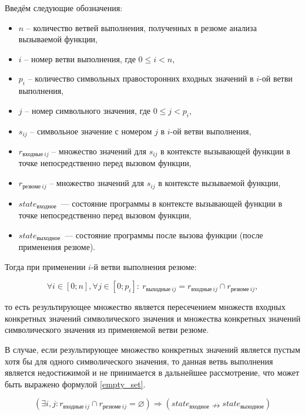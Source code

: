 Введём следующие обозначения:
\begin{itemize}
 \item $n$ – количество ветвей выполнения, полученных в резюме анализа вызываемой функции,
 \item $i$ – номер ветви выполнения, где $0 \leqslant i < n$,
 \item $p_i$ – количество символьных правосторонних входных значений в $i$-ой ветви выполнения,
 \item $j$ – номер символьного значения, где $0 \leqslant j < p_i$,
 \item $s_{ij}$ – символьное значение с номером $j$ в $i$-ой ветви выполнения,
 \item $r_{\text{входные}\ ij}$ – множество значений для $s_{ij}$ в контексте вызывающей функции в точке непосредственно перед вызовом функции,
 \item $r_{\text{резюме}\ ij}$ – множество значений для $s_{ij}$ в контексте вызываемой функции,
 \item $state_{\text{входное}}$~--- состояние программы в контексте вызывающей функции в точке непосредственно перед вызовом функции,
 \item $state_{\text{выходное}}$~--- состояние программы после вызова функции (после применения резюме).

\end{itemize}

Тогда при применении $i$-й ветви выполнения резюме:

\begin{equation*}
\label{result_sval}
 \forall i \in [0; n], \forall j \in [0; p_i]:\ r_{\text{выходные}\ ij} =  r_{\text{входные}\ ij} \cap r_{\text{резюме}\ ij},
\end{equation*}

то есть результирующее множество является пересечением множеств входных конкретных значений символического значения и множества конкретных значений символического значения из применяемой ветви резюме.

В случае, если результирующее множество конкретных значений является пустым хотя бы для одного символического значения, то данная ветвь выполнения является недостижимой и не принимается в дальнейшее рассмотрение, что может быть выражено формулой \ref{empty_set}.

\begin{equation*}
 \label{empty_set}
 (\exists i, j: r_{\text{входные}\ ij} \cap r_{\text{резюме}\ ij} = \varnothing)  \Rightarrow (state_{\text{входное}} \nrightarrow state_{\text{выходное}})
\end{equation*}


